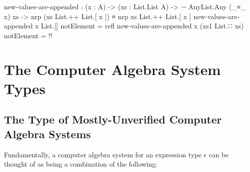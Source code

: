 \documentclass{report}
\begin{document}
\begin{code}
  new-values-are-appended :
    (x : A) ->
    (xs : List.List A) ->
    ¬ AnyList.Any (_≡_ x) xs ->
    nrp (xs List.++ List.[ x ]) ≡ nrp xs List.++ List.[ x ]
  new-values-are-appended x List.[] notElement = refl
  new-values-are-appended x (xs1 List.∷ xs) notElement = {!!}
\end{code}

\chapter{The Computer Algebra System Types}

\section{The Type of Mostly-Unverified Computer Algebra Systems}
Fundamentally, a computer algebra system for an expression type \(\epsilon\) can be thought of as being a combination of the following:
\end{document}

